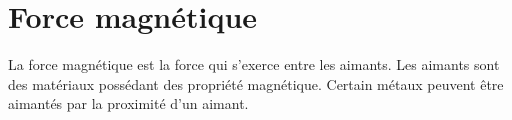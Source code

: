 
\section{Force magnétique}
%

La force magnétique est la force qui s'exerce entre les aimants.
Les aimants sont des matériaux possédant des propriété magnétique.
Certain métaux peuvent être aimantés par la proximité d'un aimant.



